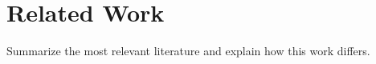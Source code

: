 \section{Related Work}
\label{sec:related-work}

Summarize the most relevant literature and explain how this work differs.
